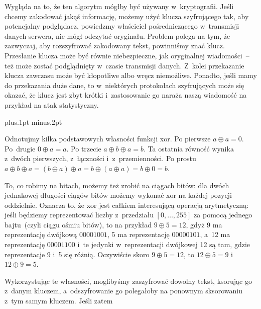Wygląda na to, że ten algorytm mógłby być używany w~kryptografii. Jeśli chcemy
zakodować jakąś informację, możemy użyć klucza szyfrującego tak, aby potencjalny
podglądacz, powiedzmy właściciel pośredniczącego w~transmisji danych serwera,
nie mógł odczytać oryginału. Problem polega na tym, że zazwyczaj, aby
rozszyfrować zakodowany tekst, powinniśmy znać klucz. Przesłanie klucza może być
równie niebezpieczne, jak oryginalnej wiadomości~--
też może zostać
podglądnięty w~czasie transmisji danych. Z~kolei przekazanie klucza zawczasu
może być kłopotliwe albo wręcz niemożliwe. Ponadto, jeśli mamy do przekazania
duże dane, to w~niektórych protokołach szyfrujących może się okazać, że klucz
jest zbyt krótki i~zastosowanie go naraża naszą wiadomość na przykład na atak
statystyczny. 

\vspace*{\parskip}
\begin{dwieszpalty}\baselineskip12pt plus.1pt minus.2pt



Odnotujmy kilka podstawowych własności funkcji xor. Po pierwsze $a \oplus a = 0$. Po~drugie $0
\oplus a = a$. Po trzecie $a \oplus b \oplus a = b$. Ta ostatnia równość wynika
z~dwóch pierwszych, z~łączności i~z~przemienności. Po prostu $a  \oplus  b
\oplus  a = (b \oplus a) \oplus a = b \oplus (a \oplus a) = b \oplus 0 =
b$. 

To, co robimy na bitach, możemy też zrobić na ciągach bitów: dla dwóch jednakowej
długości ciągów  bitów możemy wykonać xor na każdej pozycji oddzielnie. Oznacza
to, że xor jest całkiem interesującą operacją arytmetyczną: jeśli będziemy
reprezentować liczby z~przedziału $[0,\dots,255]$ za pomocą jednego
bajtu~(czyli ciągu ośmiu bitów), to na
przykład $9 \oplus 5 =12$, gdyż 9 ma reprezentację dwójkową $00001001$, 5 ma
reprezentację $00000101$, a~12 ma reprezentację $00001100$ i~te jedynki
w~reprezentacji dwójkowej 12 są tam, gdzie reprezentacje 9 i~5 się różnią.
Oczywiście skoro $9 \oplus 5=12$, to $12 \oplus 5=9 $ i $12 \oplus 9=5$. 


Wykorzystując te własności, moglibyśmy zaszyfrować dowolny tekst, ksorując go
z~danym kluczem, a~odszyfrowanie go polegałoby na ponownym sksorowaniu z~tym
samym kluczem. Jeśli zatem
\end{dwieszpalty}

